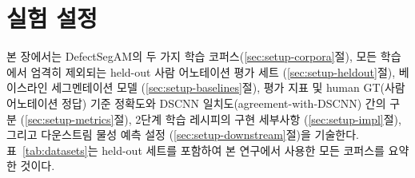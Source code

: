 \section{실험 설정}\label{sec:setup}

본 장에서는 DefectSegAM의 두 가지 학습 코퍼스(\ref{sec:setup-corpora}절),
모든 학습에서 엄격히 제외되는 held-out 사람 어노테이션 평가 세트
(\ref{sec:setup-heldout}절), 베이스라인 세그멘테이션 모델
(\ref{sec:setup-baselines}절), 평가 지표 및 human GT(사람 어노테이션 정답)
기준 정확도와 DSCNN 일치도(agreement-with-DSCNN) 간의 구분
(\ref{sec:setup-metrics}절), 2단계 학습 레시피의 구현 세부사항
(\ref{sec:setup-impl}절), 그리고 다운스트림 물성 예측 설정
(\ref{sec:setup-downstream}절)을 기술한다. 표~\ref{tab:datasets}는 held-out
세트를 포함하여 본 연구에서 사용한 모든 코퍼스를 요약한 것이다.


